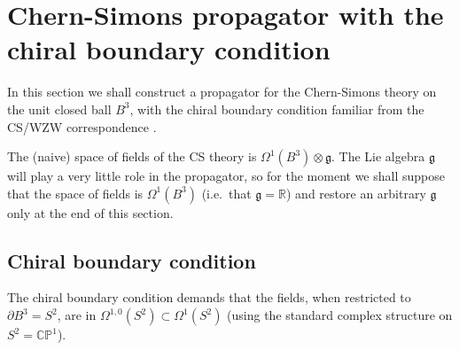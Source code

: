 \documentclass[a4paper]{amsart}
\theoremstyle{plain}
\theoremstyle{definition}
\newcommand{\g}{\mathfrak{g}}
\newcommand{\R}{\mathbb{R}}
\newcommand{\CP}{\mathbb{CP}^1}
\newcommand{\cf}{\mathsf{Conf}}
\begin{document}
	
	

\section{Chern-Simons propagator with the chiral boundary condition}

In this section we shall construct a propagator for the Chern-Simons theory on the unit closed ball $B^3$, with the chiral boundary condition familiar from the CS/WZW correspondence \cite{W}.

The (naive) space of fields of the CS theory is $\Omega^1(B^3)\otimes\g$. The Lie algebra $\g$ will play a very little role in the propagator, so for the moment we shall suppose that the space of fields is $\Omega^1(B^3)$ (i.e.\ that $\g=\R$) and restore an arbitrary $\g$ only at the  end of this section.

\subsection{Chiral boundary condition}
The chiral boundary condition demands that the fields, when restricted to $\partial B^3 = S^2$, are in $\Omega^{1,0}(S^2)\subset\Omega^1(S^2)$ (using the standard complex structure on $S^2=\CP$). 
\end{document}
